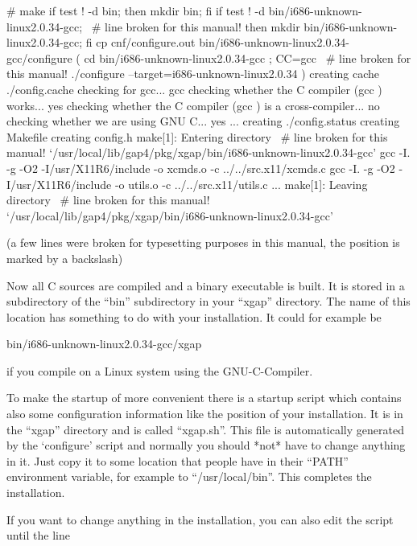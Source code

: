 \begintt
# make
if test ! -d bin;  then mkdir bin;  fi
if test ! -d bin/i686-unknown-linux2.0.34-gcc; \ # line broken for this manual!
                then mkdir bin/i686-unknown-linux2.0.34-gcc;  fi
cp cnf/configure.out bin/i686-unknown-linux2.0.34-gcc/configure
( cd bin/i686-unknown-linux2.0.34-gcc ; CC=gcc \ # line broken for this manual!
                ./configure --target=i686-unknown-linux2.0.34  )
creating cache ./config.cache
checking for gcc... gcc
checking whether the C compiler (gcc  ) works... yes
checking whether the C compiler (gcc  ) is a cross-compiler... no
checking whether we are using GNU C... yes
...
creating ./config.status
creating Makefile
creating config.h
make[1]: Entering directory \                   # line broken for this manual!
     `/usr/local/lib/gap4/pkg/xgap/bin/i686-unknown-linux2.0.34-gcc'
gcc -I. -g -O2 -I/usr/X11R6/include  -o xcmds.o -c ../../src.x11/xcmds.c
gcc -I. -g -O2 -I/usr/X11R6/include  -o utils.o -c ../../src.x11/utils.c
...
make[1]: Leaving directory \                    # line broken for this manual!
     `/usr/local/lib/gap4/pkg/xgap/bin/i686-unknown-linux2.0.34-gcc'
\endtt

(a few lines were broken for typesetting purposes in this manual, the
position is marked by a backslash) 

Now all C sources are compiled and a binary executable is built. It is
stored in a subdirectory of the ``bin'' subdirectory in your ``xgap''
directory. The name of this location has something to do with your
installation. It could for example be

\begintt
bin/i686-unknown-linux2.0.34-gcc/xgap
\endtt

if you compile on a Linux system using the GNU-C-Compiler.


To make the startup of {\XGAP} more convenient there is a startup script
which contains also some configuration information like the position of
your {\GAP} installation. It is in the ``xgap'' directory
and is called ``xgap.sh''. This file is automatically generated
by the `configure' script and normally you should *not* have to change 
anything in it. Just copy it to some location that people have in their
``PATH'' environment variable, for example to ``/usr/local/bin''.
This completes the installation.

If you want to change anything in the installation, you
can also edit the script until the line

